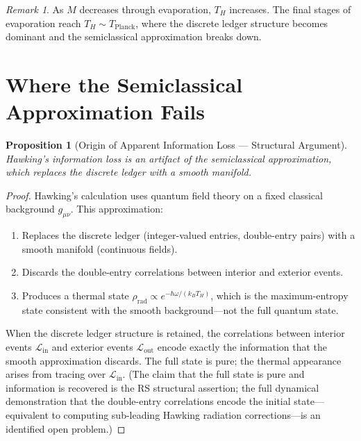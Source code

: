 \documentclass[12pt,a4paper]{article}
\newtheorem{proposition}[theorem]{Proposition}
\theoremstyle{definition}
\theoremstyle{remark}
\newtheorem{remark}[theorem]{Remark}
\begin{document}
\begin{remark}
As $M$ decreases through evaporation, $T_H$ increases.  The final
stages of evaporation reach $T_H \sim T_{\mathrm{Planck}}$,
where the discrete ledger structure becomes dominant and the
semiclassical approximation breaks down.
\end{remark}

\section{Where the Semiclassical Approximation Fails}
\label{sec:failure}

\begin{proposition}[Origin of Apparent Information Loss --- Structural Argument]
\label{thm:failure}
Hawking's information loss is an artifact of the semiclassical
approximation, which replaces the discrete ledger with a smooth
manifold.
\end{proposition}

\begin{proof}
Hawking's calculation uses quantum field theory on a fixed
classical background $g_{\mu\nu}$.  This approximation:
\begin{enumerate}[label=(\roman*),nosep]
  \item Replaces the discrete ledger (integer-valued entries,
  double-entry pairs) with a smooth manifold (continuous fields).
  \item Discards the double-entry correlations between interior
  and exterior events.
  \item Produces a thermal state
  $\rho_{\mathrm{rad}} \propto e^{-\hbar\omega/(k_B T_H)}$,
  which is the maximum-entropy state consistent with the smooth
  background---not the full quantum state.
\end{enumerate}
When the discrete ledger structure is retained, the correlations
between interior events $\mathcal{L}_{\mathrm{in}}$ and exterior
events $\mathcal{L}_{\mathrm{out}}$ encode exactly the information
that the smooth approximation discards.  The full state is pure;
the thermal appearance arises from tracing over
$\mathcal{L}_{\mathrm{in}}$.  (The claim that the full state is
pure and information is recovered is the RS structural assertion;
the full dynamical demonstration that the double-entry correlations
encode the initial state---equivalent to computing sub-leading
Hawking radiation corrections---is an identified open problem.)
\end{proof}
\end{document}
